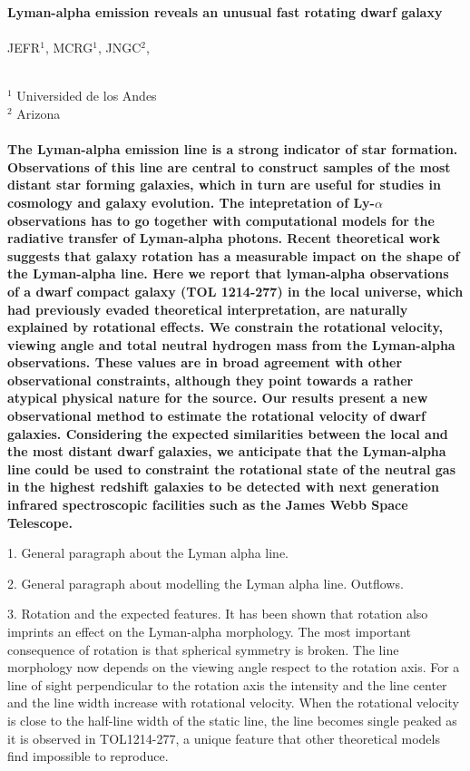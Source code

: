 \documentclass[a4paper, usenatbib, 12pt]{article}
\newcommand{\tol}{TOL1214-277}
\begin{document}
\pagestyle{empty}
\noindent
\textbf{Lyman-alpha emission reveals an unusual fast rotating dwarf galaxy}  
\\
\\
JEFR$^{1}$, MCRG$^1$, JNGC$^2$,
\\
\\
\scriptsize
{$^1$ Universided de los Andes
\\
$^2$ Arizona
\normalsize
\\
\\
\textbf{The Lyman-alpha emission line is a strong indicator of star formation.
Observations of this line are central to construct samples of the most
distant star forming galaxies, which in turn are useful for studies in
cosmology and galaxy evolution.  
The intepretation of Ly-$\alpha$ observations has to go together with
computational models for the radiative transfer of Lyman-alpha photons.
Recent theoretical work suggests that galaxy rotation has a measurable
impact on the shape of the Lyman-alpha line.  
Here we report that lyman-alpha observations of a dwarf compact galaxy (TOL
1214-277) in the local universe, which had previously evaded theoretical 
interpretation, are naturally explained by rotational effects.
We constrain the rotational velocity, viewing angle and total
neutral hydrogen mass from the Lyman-alpha observations.
These values are in broad agreement with other observational
constraints, although  they point towards a rather atypical physical
nature for the source.  
Our results present a new observational method to estimate the rotational
velocity of dwarf galaxies.
Considering the expected similarities between the local and the most
distant dwarf galaxies, we anticipate that the Lyman-alpha line could be
used to constraint the rotational state of the neutral gas in the
highest redshift galaxies to be detected with next generation infrared
spectroscopic facilities such as the James Webb Space Telescope.}




1. General paragraph about the Lyman alpha line.

2. General paragraph about modelling the Lyman alpha
line. Outflows.

3. Rotation and the expected features.
It has been shown that rotation also imprints an effect on the
Lyman-alpha morphology. 
The most important consequence of rotation is that spherical 
symmetry is broken.
The line morphology now depends on the viewing angle respect to the
rotation axis.  
For a line of sight perpendicular to the rotation axis the intensity and
the line center and the line width increase with rotational velocity. 
When the rotational velocity is close to the half-line width of the
static line, the line becomes single peaked as it is observed in
\tol, a unique feature that other theoretical models find
impossible to reproduce.



}
\end{document}
